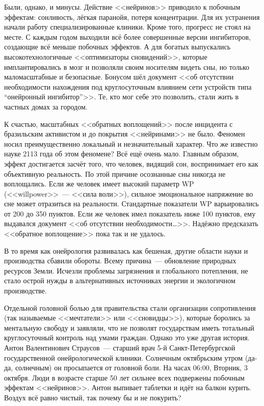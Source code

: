 \documentclass[openany, oneside]{book}
\begin{document}
Были, однако, и минусы. Действие <<нейринов>> приводило к побочным эффектам: сонливость, лёгкая паранойя, потеря концентрации. Для их устранения начали работу специализированные клиники. Кроме того, прогресс не стоял на месте. С каждым годом выходили всё более совершенные версии ингибиторов, создающие всё меньше побочных эффектов. А для богатых выпускались высокотехнологичные <<оптимизаторы сновидений>>, которые имплантировались в мозг и позволяли своим носителям видеть сны, но только маломасштабные и безопасные. Бонусом шёл документ <<об отсутствии необходимости нахождения под круглосуточным влиянием сети устройств типа ``онейронный ингибитор''>>. Те, кто мог себе это позволить, стали жить в частных домах за городом.

К счастью, масштабных <<обратных воплощений>> после инцидента с бразильским активистом и до покрытия <<нейринами>> не было. Феномен носил преимущественно локальный и незначительный характер. Что же известно науке 2113 года об этом феномене? Всё ещё очень мало. Главным образом, эффект достигается засчёт того, что человек, видящий сон, воспринимает его как объективную реальность. По этой причине осознанные сны никогда не воплощались. Если же человек имеет высокий параметр WP (<<willpower>>~--- <<сила воли>>), сильное эмоциональное напряжение во сне может отразиться на реальности. Стандартные показатели WP варьировались от 200 до 350 пунктов. Если же человек имел показатель ниже 100 пунктов, ему выдавался документ <<об отсутствии необходимости\dots>>. Надёжно предсказать <<обратное воплощение>> пока так и не удалось.

В то время как онейрология развивалась как бешеная, другие области науки и производства сбавили обороты. Всему причина~--- обновление природных ресурсов Земли. Исчезли проблемы загрязнения и глобального потепления, не стало острой нужды в альтернативных источниках энергии и экологичном производстве.

Отдельной головной болью для правительства стали организации сопротивления (так называемые <<мечтатели>> или <<сновидцы>>), которые боролись за ментальную свободу и заявляли, что не позволят государствам иметь тотальный круглосуточный контроль над умами граждан. Однако это уже другая история.\\

Антон Валентинович Страусов~--- старший врач 5-й Санкт-Петербургской государственной онейрологической клиники. Солнечным октябрьским утром (да-да, солнечным) он просыпается от головной боли. На часах 06:00, Вторник, 3 октября. Люди в возрасте старше 50 лет сильнее всех подвержены побочным эффектам <<нейринов>>. Антон выпивает таблетки и идёт на балкон курить. Воздух всё равно чистый, так почему бы и не покурить?
\end{document}
